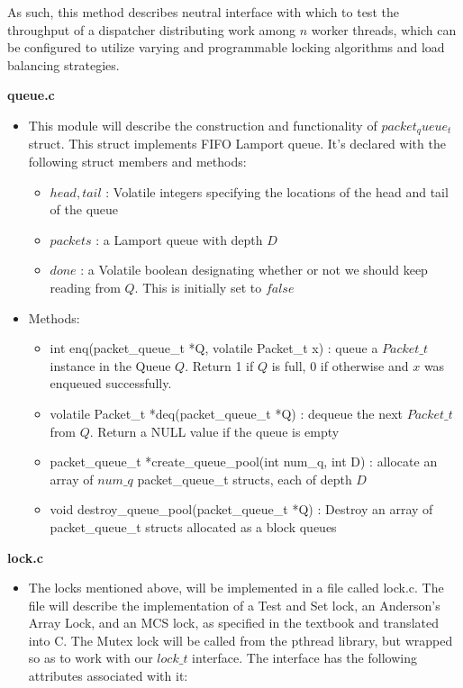\documentclass[]{article}
\begin{document}
\begin{itemize}
\begin{itemize}
		As such, this method describes neutral interface with which to test the throughput of a dispatcher distributing work among $n$ worker threads, which can be configured to utilize varying and programmable locking algorithms and load balancing strategies.
	\end{itemize}
	\textbf{queue.c}
	\begin{itemize}
		\item This module will describe the construction and functionality of  $packet_queue_t$ struct. This struct implements FIFO Lamport queue. It's declared with the following struct members and methods:
		\begin{itemize}
			\item $head, tail$ : Volatile integers specifying the locations of the head and tail of the queue
			\item $packets$ : a Lamport queue with depth $D$
			\item $done$ : a Volatile boolean designating whether or not we should keep reading from $Q$. This is initially set to $false$
		\end{itemize}
		\item Methods:
		\begin{itemize}
			\item int enq(packet\_queue\_t *Q, volatile Packet\_t x) : queue a $Packet\_t$ instance in the Queue $Q$. Return 1 if $Q$ is full, 0 if otherwise and $x$ was enqueued successfully.
			\item volatile Packet\_t *deq(packet\_queue\_t *Q) : dequeue the next $Packet\_t$ from $Q$. Return a NULL value if the queue is empty
			\item packet\_queue\_t *create\_queue\_pool(int num\_q, int D) : allocate an array of $num\_q$ packet\_queue\_t structs, each of depth $D$
			\item void destroy\_queue\_pool(packet\_queue\_t *Q) : Destroy an array of packet\_queue\_t structs allocated as a block queues
		\end{itemize}
	\end{itemize}
	\textbf{lock.c}
	\begin{itemize}
		\item The locks mentioned above, will be implemented in a file called lock.c. The file will describe the implementation of a Test and Set lock, an Anderson's Array Lock, and an MCS lock, as specified in the textbook and translated into C. The Mutex lock will be called from the pthread library, but wrapped so as to work with our $lock\_t$ interface. The interface has the following attributes associated with it:

\end{itemize}
\end{itemize}
\end{document}
